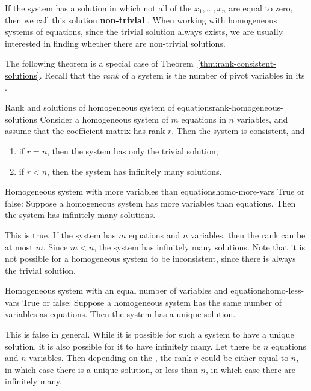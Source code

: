 If the system has a solution in which not all of the
$x_1,\ldots, x_n$ are equal to zero, then we call this solution
\textbf{non-trivial}%
%
.  When
working with homogeneous systems of equations, since the trivial
solution always exists, we are usually interested in finding whether
there are non-trivial solutions.

The following theorem is a special case of
Theorem~\ref{thm:rank-consistent-solutions}. Recall that the
{\em rank}
of a system is the number of pivot variables in its {\ef}.

\begin{theorem}{Rank and solutions of homogeneous system of equations}{rank-homogeneous-solutions}
  Consider a homogeneous system of $m$ equations in $n$ variables, and
  assume that the coefficient matrix has rank $r$. Then the system is
  consistent, and
\begin{enumerate}
\item if $r=n$, then the system has only the trivial solution;
\item if $r<n$, then the system has infinitely many solutions.
\end{enumerate}
\end{theorem}

\begin{example}{Homogeneous system with more variables than equations}{homo-more-vars}
  True or false: Suppose a homogeneous system has more variables than
  equations. Then the system has infinitely many solutions.
\end{example}

\begin{solution}
  This is true. If the system has $m$ equations and $n$ variables,
  then the rank can be at most $m$. Since $m<n$, the system has
  infinitely many solutions. Note that it is not possible for a
  homogeneous system to be inconsistent, since there is always the
  trivial solution.
\end{solution}

\begin{example}{Homogeneous system with an equal number of variables and equations}{homo-less-vars}
  True or false: Suppose a homogeneous system has the same number of
  variables as equations. Then the system has a unique solution.
\end{example}

\begin{solution}
  This is false in general. While it is possible for such a system to
  have a unique solution, it is also possible for it to have
  infinitely many. Let there be $n$ equations and $n$ variables.  Then
  depending on the {\ef}, the rank $r$ could be either equal to $n$,
  in which case there is a unique solution, or less than $n$, in which
  case there are infinitely many.
\end{solution}

